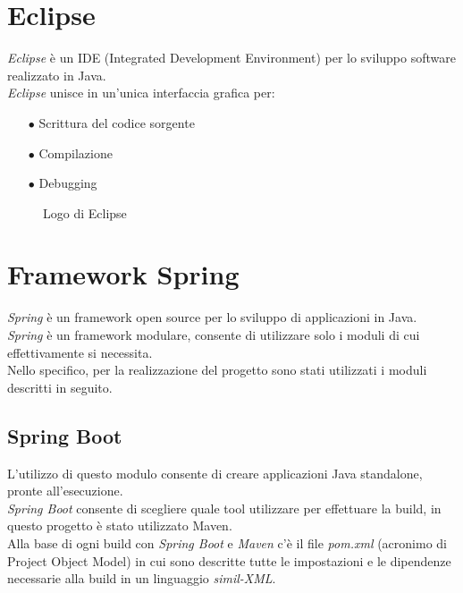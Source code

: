 \section{Eclipse}
\emph{Eclipse} è un IDE (Integrated Development Environment) per lo sviluppo software realizzato in Java.\\
\emph{Eclipse} unisce in un’unica interfaccia grafica per:
\begin{itemize}
	\item[$\bullet$]Scrittura del codice sorgente
	\item[$\bullet$]Compilazione
	\item[$\bullet$]Debugging
\end{itemize}
\begin{figure}[ht]
	\centering
	\caption{Logo di Eclipse}
	\label{fig:one}
\end{figure}

\section{Framework Spring}
\emph{Spring} è un framework open source per lo sviluppo di applicazioni in Java.\\
\emph{Spring} è un framework modulare, consente di utilizzare solo i moduli di cui effettivamente si necessita.\\
Nello specifico, per la realizzazione del progetto sono stati utilizzati i moduli descritti in seguito.
\subsection{Spring Boot}
L’utilizzo di questo modulo consente di creare applicazioni Java standalone, pronte all’esecuzione.\\
\emph{Spring Boot} consente di scegliere quale tool utilizzare per effettuare la build, in questo progetto è stato utilizzato Maven.\\
Alla base di ogni build con \emph{Spring Boot} e \emph{Maven} c’è il file \emph{pom.xml} (acronimo di Project Object Model) in cui sono descritte tutte le impostazioni e le dipendenze necessarie alla build in un linguaggio \emph{simil-XML}.
